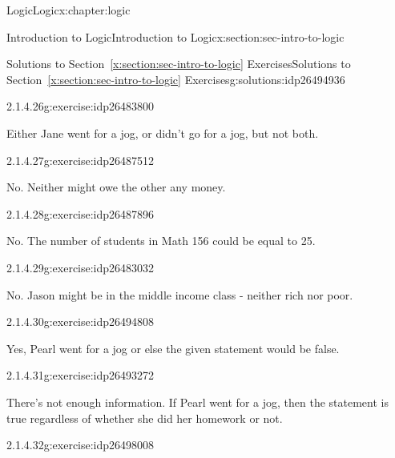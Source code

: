\documentclass[twoside,10pt,]{book}
\newcommand{\xreffont}{\relax}
\numberwithin{equation}{section}
\begin{document}
\begin{chapterptx}{Logic}{}{Logic}{}{}{x:chapter:logic}
\begin{sectionptx}{Introduction to Logic}{}{Introduction to Logic}{}{}{x:section:sec-intro-to-logic}
\begin{solutions-subsection}{Solutions to Section~{\xreffont\ref*{x:section:sec-intro-to-logic}} Exercises}{}{Solutions to Section~{\xreffont\ref*{x:section:sec-intro-to-logic}} Exercises}{}{}{g:solutions:idp26494936}
\begin{exercisegroup}
\begin{divisionsolutioneg}{2.1.4.26}{}{g:exercise:idp26483800}%
\par\smallskip%
\noindent\hypertarget{g:solution:idp26490968-main}{}Either Jane went for a jog, or didn't go for a jog, but not both.\end{divisionsolutioneg}%
\end{exercisegroup}
\par\medskip\noindent
\begin{exercisegroup}
\begin{divisionsolutioneg}{2.1.4.27}{}{g:exercise:idp26487512}%
\par\smallskip%
\noindent\hypertarget{g:solution:idp26487768-main}{}No.  Neither might owe the other any money.\end{divisionsolutioneg}%
\begin{divisionsolutioneg}{2.1.4.28}{}{g:exercise:idp26487896}%
\par\smallskip%
\noindent\hypertarget{g:solution:idp26488920-main}{}No.  The number of students in Math 156 could be equal to 25.\end{divisionsolutioneg}%
\begin{divisionsolutioneg}{2.1.4.29}{}{g:exercise:idp26483032}%
\par\smallskip%
\noindent\hypertarget{g:solution:idp26486872-main}{}No. Jason might be in the middle income class - neither rich nor poor.\end{divisionsolutioneg}%
\end{exercisegroup}
\par\medskip\noindent
\begin{exercisegroup}
\begin{divisionsolutioneg}{2.1.4.30}{}{g:exercise:idp26494808}%
\par\smallskip%
\noindent\hypertarget{g:solution:idp26495832-main}{}Yes, Pearl went for a jog or else the given statement would be false.\end{divisionsolutioneg}%
\begin{divisionsolutioneg}{2.1.4.31}{}{g:exercise:idp26493272}%
\par\smallskip%
\noindent\hypertarget{g:solution:idp26494424-main}{}There's not enough information.  If Pearl went for a jog, then the statement is true regardless of whether she did her homework or not.\end{divisionsolutioneg}%
\begin{divisionsolutioneg}{2.1.4.32}{}{g:exercise:idp26498008}%
\par\smallskip%

\end{divisionsolutioneg}
\end{exercisegroup}
\end{solutions-subsection}
\end{sectionptx}
\end{chapterptx}
\end{document}
